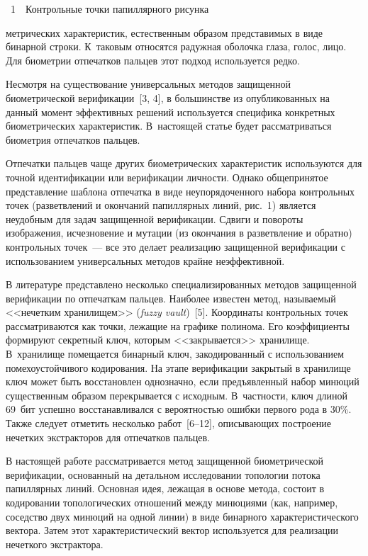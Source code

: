 \begin{multicols}{2}
\begin{center}
\vspace*{9pt}
{{\figurename~1}\ \ \small{Контрольные точки папиллярного рисунка}}
\end{center}

\vspace*{6pt}

\addtocounter{figure}{1}


\noindent
мет\-ри\-че\-ских характеристик, естественным образом представимых в виде бинарной 
строки. К~таковым относятся радужная оболочка глаза, голос, лицо. Для био\-мет\-рии 
отпечатков пальцев этот подход используется редко. 
      
      Несмотря на существование универсальных методов защищенной биометрической 
верификации~[3, 4], в большинстве из опубликованных на данный момент эффективных 
решений используется специфика конкретных биометрических характеристик. 
В~настоящей статье будет рассматриваться биометрия отпечатков пальцев. 

Отпечатки 
пальцев чаще других биометрических характеристик используются для точной 
идентификации или верификации личности. Однако общепринятое представление 
шаблона отпечатка в виде неупорядоченного набора контрольных точек (разветвлений и 
окончаний папиллярных линий, рис.~1) является неудобным для задач защищенной 
верификации. Сдвиги и повороты изображения, исчезновение и мутации (из окончания в 
разветвление и обратно) контрольных точек~--- все это делает реализацию защищенной 
верификации с использованием универсальных методов крайне неэффективной.
      

      
      В литературе представлено несколько специализированных методов защищенной 
верификации по отпечаткам пальцев. Наиболее известен метод, называемый <<нечетким 
хранилищем>> (\textit{fuzzy vault})~[5]. Координаты контрольных точек рассматриваются 
как точки, лежащие на графике полинома. Его коэффициенты формируют секретный 
ключ, которым <<закрывается>> хранилище. В~хранилище помещается бинарный ключ, 
закодированный с использованием помехоустойчивого кодирования. На этапе 
верификации закрытый в хранилище ключ может быть восстановлен однозначно, если 
предъявленный набор минюций существенным образом перекрывается с исходным. 
В~част\-ности, ключ длиной 69~бит успешно восстанавливался с вероятностью ошибки 
первого рода в 30\%. Также следует отметить несколько работ~[6--12], описывающих 
построение нечетких экстракторов для отпечатков пальцев. 
      
      В настоящей работе рассматривается метод защищенной биометрической 
верификации, основанный на детальном исследовании топологии потока папиллярных 
линий. Основная идея, лежащая в основе метода, состоит в кодировании топологических 
отношений между минюциями (как, например, соседство двух минюций на одной линии) 
в виде бинарного характеристического вектора. Затем этот характеристический вектор 
используется для реализации нечеткого экстрактора.


\end{multicols}
